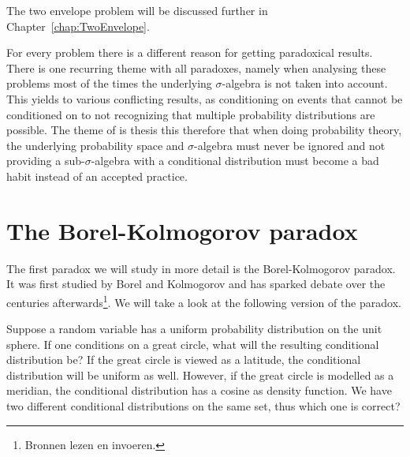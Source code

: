 \documentclass[a4paper]{report}
\theoremstyle{plain}
\theoremstyle{definition}
\theoremstyle{remark}
\numberwithin{equation}{chapter}
\DeclareMathOperator{\1}{\mathbbm{1}}
\begin{document}
The two envelope problem will be discussed further in Chapter~\ref{chap:TwoEnvelope}.

For every problem there is a different reason for getting paradoxical results. There is one recurring theme with all paradoxes, namely when analysing these problems most of the times the underlying $\sigma$-algebra is not taken into account. This yields to various conflicting results, as conditioning on events that cannot be conditioned on to not recognizing that multiple probability distributions are possible. The theme of is thesis this therefore that when doing probability theory, the underlying probability space and $\sigma$-algebra must never be ignored and not providing a sub-$\sigma$-algebra with a conditional distribution must become a bad habit instead of an accepted practice.

\chapter{The Borel-Kolmogorov paradox}\label{chap:BorelKolmogorov}
The first paradox we will study in more detail is the Borel-Kolmogorov paradox. It was first studied by Borel \cite{Borel09} and Kolmogorov \cite{Kolmogorov33} and has sparked debate over the centuries afterwards\footnote{Bronnen lezen en invoeren.}. We will take a look at the following version of the paradox.

Suppose a random variable has a uniform probability distribution on the unit sphere. If one conditions on a great circle, what will the resulting conditional distribution be? If the great circle is viewed as a latitude, the conditional distribution will be uniform as well. However, if the great circle is modelled as a meridian, the conditional distribution has a cosine as density function. We have two different conditional distributions on the same set, thus which one is correct?
\end{document}
